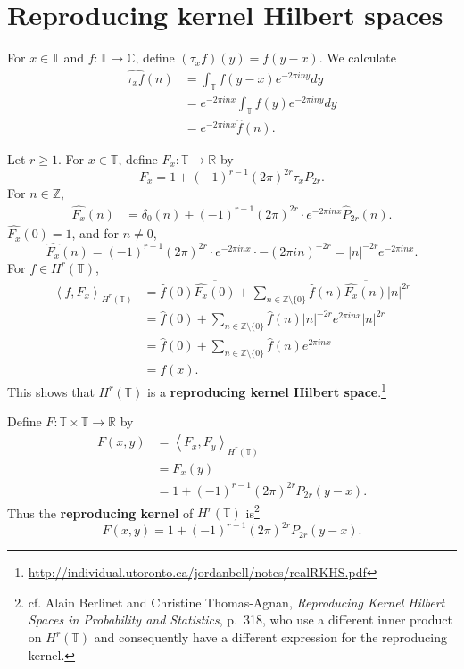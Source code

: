 \documentclass{article}
\newcommand{\inner}[2]{\left\langle #1, #2 \right\rangle}
\theoremstyle{definition}
\begin{document}
\section{Reproducing kernel Hilbert spaces}
For $x \in \mathbb{T}$ and $f:\mathbb{T} \to \mathbb{C}$, define $(\tau_x f)(y)=f(y-x)$. 
We calculate
\begin{align*}
\widehat{\tau_x f}(n)&=\int_{\mathbb{T}} f(y-x) e^{-2\pi in y} dy\\
&=e^{-2\pi inx}  \int_{\mathbb{T}} f(y) e^{-2\pi iny} dy\\
&=e^{-2\pi inx} \widehat{f}(n).
\end{align*}

Let $r \geq 1$. For $x \in \mathbb{T}$, define $F_x:\mathbb{T} \to \mathbb{R}$ by
\[
F_x = 1 + (-1)^{r-1} (2\pi)^{2r} \tau_x P_{2r}.
\] 
For $n \in \mathbb{Z}$,
\begin{align*}
\widehat{F_x}(n)&=\delta_0(n) + (-1)^{r-1} (2\pi)^{2r} \cdot e^{-2\pi inx} \widehat{P}_{2r}(n).
\end{align*}
$\widehat{F_x}(0) = 1$, and for $n \neq 0$,
\[
\widehat{F_x}(n) = (-1)^{r-1} (2\pi)^{2r} \cdot e^{-2\pi inx} \cdot -(2\pi in)^{-2r}
= |n|^{-2r} e^{-2\pi inx}.
\]
For $f \in H^r(\mathbb{T})$,
\begin{align*}
\inner{f}{F_x}_{H^r(\mathbb{T})}&=\widehat{f}(0) \overline{\widehat{F_x}(0)}
+\sum_{n \in \mathbb{Z} \setminus \{0\}} \widehat{f}(n) \overline{\widehat{F_x}(n)} |n|^{2r}\\
&=\widehat{f}(0) + \sum_{n \in \mathbb{Z} \setminus \{0\}} \widehat{f}(n) |n|^{-2r} e^{2\pi inx} |n|^{2r}\\
&=\widehat{f}(0) + \sum_{n \in \mathbb{Z} \setminus \{0\}} \widehat{f}(n) e^{2\pi inx}\\
&=f(x).
\end{align*}
This shows that $H^r(\mathbb{T})$ is a \textbf{reproducing kernel Hilbert space}.\footnote{\url{http://individual.utoronto.ca/jordanbell/notes/realRKHS.pdf}}

Define $F:\mathbb{T} \times \mathbb{T} \to \mathbb{R}$ by
\begin{align*}
F(x,y)&=\inner{F_x}{F_y}_{H^r(\mathbb{T})}\\
&=F_x(y)\\
&=1+(-1)^{r-1}(2\pi)^{2r} P_{2r}(y-x).
\end{align*}
Thus the \textbf{reproducing kernel} of $H^r(\mathbb{T})$ is\footnote{cf. Alain Berlinet and Christine Thomas-Agnan, {\em Reproducing Kernel Hilbert Spaces
in Probability and Statistics}, p.~318, who use a different inner product on $H^r(\mathbb{T})$ and consequently have a different expression
for the reproducing kernel.}
\[
F(x,y)=1+(-1)^{r-1}(2\pi)^{2r} P_{2r}(y-x).
\]
\end{document}
